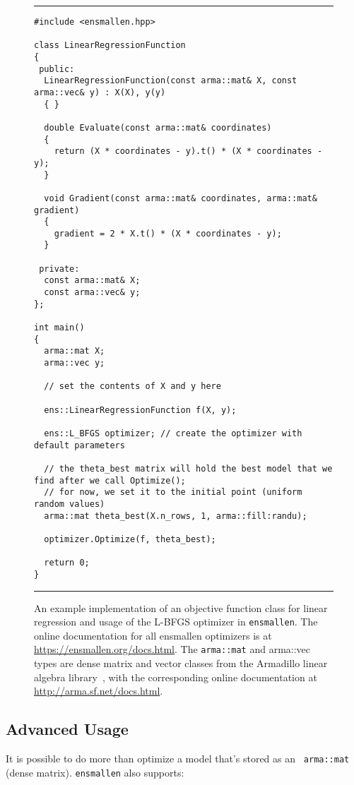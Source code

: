 \begin{figure}[!t]
\hrule
\vspace{1ex}
\centering
\begin{verbatim}
#include <ensmallen.hpp>

class LinearRegressionFunction
{
 public:
  LinearRegressionFunction(const arma::mat& X, const arma::vec& y) : X(X), y(y)
  { }

  double Evaluate(const arma::mat& coordinates)
  {
    return (X * coordinates - y).t() * (X * coordinates - y);
  }

  void Gradient(const arma::mat& coordinates, arma::mat& gradient)
  {
    gradient = 2 * X.t() * (X * coordinates - y);
  }

 private:
  const arma::mat& X;
  const arma::vec& y;
};

int main()
{
  arma::mat X;
  arma::vec y;
  
  // set the contents of X and y here
  
  ens::LinearRegressionFunction f(X, y);

  ens::L_BFGS optimizer; // create the optimizer with default parameters

  // the theta_best matrix will hold the best model that we find after we call Optimize();
  // for now, we set it to the initial point (uniform random values)
  arma::mat theta_best(X.n_rows, 1, arma::fill:randu);

  optimizer.Optimize(f, theta_best);

  return 0;
}
\end{verbatim}
\hrule
\vspace*{-0.5em}
\caption{An example implementation of an objective function class for linear
regression and usage of the L-BFGS optimizer in {\tt ensmallen}.
The online documentation for all ensmallen optimizers
is at \mbox{\url{https://ensmallen.org/docs.html}}.
The {\tt arma::mat} and {arma::vec} types are 
dense matrix and vector classes
from the Armadillo linear algebra library~\cite{sanderson2016armadillo},
with the corresponding online documentation at \mbox{\url{http://arma.sf.net/docs.html}}.
}
\label{fig:lr_function}
\end{figure}


\subsection{Advanced Usage}

It is possible to do more than optimize a model that's stored as an {\tt
arma::mat} (dense matrix).  {\tt ensmallen} also supports:

